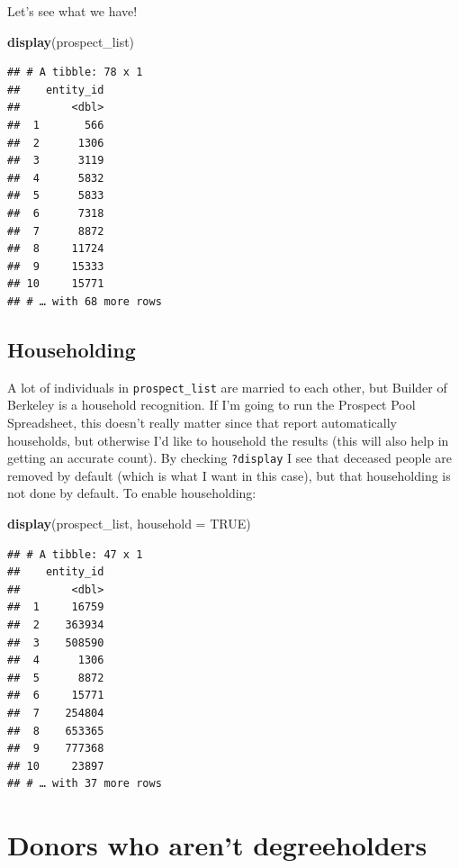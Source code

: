 \documentclass[]{book}
\newenvironment{Shaded}{\begin{snugshade}}{\end{snugshade}}
\newcommand{\DataTypeTok}[1]{\textcolor[rgb]{0.13,0.29,0.53}{#1}}
\newcommand{\KeywordTok}[1]{\textcolor[rgb]{0.13,0.29,0.53}{\textbf{#1}}}
\newcommand{\NormalTok}[1]{#1}
\newcommand{\OtherTok}[1]{\textcolor[rgb]{0.56,0.35,0.01}{#1}}
\begin{document}
Let's see what we have!

\begin{Shaded}
\begin{Highlighting}[]
\KeywordTok{display}\NormalTok{(prospect_list)}
\end{Highlighting}
\end{Shaded}

\begin{verbatim}
## # A tibble: 78 x 1
##    entity_id
##        <dbl>
##  1       566
##  2      1306
##  3      3119
##  4      5832
##  5      5833
##  6      7318
##  7      8872
##  8     11724
##  9     15333
## 10     15771
## # … with 68 more rows
\end{verbatim}

\hypertarget{householding-1}{%
\section{Householding}\label{householding-1}}

A lot of individuals in \texttt{prospect\_list} are married to each other, but Builder of Berkeley is a household recognition. If I'm going to run the Prospect Pool Spreadsheet, this doesn't really matter since that report automatically households, but otherwise I'd like to household the results (this will also help in getting an accurate count). By checking \texttt{?display} I see that deceased people are removed by default (which is what I want in this case), but that householding is not done by default. To enable householding:

\begin{Shaded}
\begin{Highlighting}[]
\KeywordTok{display}\NormalTok{(prospect_list, }\DataTypeTok{household =} \OtherTok{TRUE}\NormalTok{)}
\end{Highlighting}
\end{Shaded}

\begin{verbatim}
## # A tibble: 47 x 1
##    entity_id
##        <dbl>
##  1     16759
##  2    363934
##  3    508590
##  4      1306
##  5      8872
##  6     15771
##  7    254804
##  8    653365
##  9    777368
## 10     23897
## # … with 37 more rows
\end{verbatim}

\hypertarget{ex-sim-donors}{%
\chapter{Donors who aren't degreeholders}\label{ex-sim-donors}}
\end{document}
